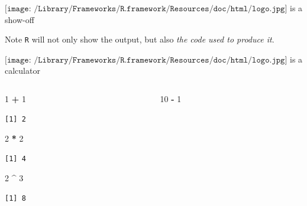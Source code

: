 \documentclass[
  11pt,
  ignorenonframetext,
]{beamer}
\newenvironment{Shaded}{\begin{snugshade}}{\end{snugshade}}
\newcommand{\DecValTok}[1]{\textcolor[rgb]{0.00,0.00,0.81}{#1}}
\newcommand{\SpecialCharTok}[1]{\textcolor[rgb]{0.81,0.36,0.00}{\textbf{#1}}}
\newcommand{\R}{\texttt{R}}
\begin{document}
\begin{frame}[fragile]{\(\texttt{[image: /Library/Frameworks/R.framework/Resources/doc/html/logo.jpg]}\)
is a show-off}
\begin{block}{Note}
\protect\hypertarget{note}{}
\R{} will not only show the output, but also \emph{the code used to
produce it}.
\end{block}
\end{frame}

\begin{frame}[fragile]{\(\texttt{[image: /Library/Frameworks/R.framework/Resources/doc/html/logo.jpg]}\)
is a calculator}
\protect\hypertarget{includegraphicsheight1emlibraryframeworksr.frameworkresourcesdochtmllogo.jpg-is-a-calculator}{}
\begin{columns}[T,onlytextwidth]
\begin{column}{0.45\textwidth}
\begin{Shaded}
\begin{Highlighting}[]
\DecValTok{1} \SpecialCharTok{+} \DecValTok{1}
\end{Highlighting}
\end{Shaded}

\begin{verbatim}
[1] 2
\end{verbatim}

\begin{Shaded}
\begin{Highlighting}[]
\DecValTok{2} \SpecialCharTok{*} \DecValTok{2}
\end{Highlighting}
\end{Shaded}

\begin{verbatim}
[1] 4
\end{verbatim}

\begin{Shaded}
\begin{Highlighting}[]
\DecValTok{2} \SpecialCharTok{\^{}} \DecValTok{3}
\end{Highlighting}
\end{Shaded}

\begin{verbatim}
[1] 8
\end{verbatim}
\end{column}

\begin{column}{0.45\textwidth}
\begin{Shaded}
\begin{Highlighting}[]
\DecValTok{10} \SpecialCharTok{{-}} \DecValTok{1}
\end{Highlighting}
\end{Shaded}


\end{column}
\end{columns}
\end{frame}
\end{document}
